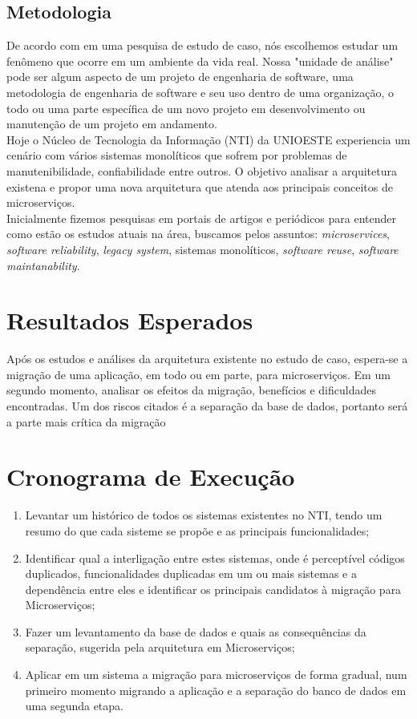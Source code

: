 \documentclass[12pt]{article}
\begin{document}
\subsection{Metodologia}
De acordo com \cite{PERRUNESON2012} em uma pesquisa de estudo de caso, nós escolhemos estudar um fenômeno que ocorre em um ambiente da vida real. Nossa "unidade de análise"\hspace{0.05cm} pode ser algum aspecto de um projeto de engenharia de software, uma metodologia de engenharia de software e seu uso dentro de uma organização, o todo ou uma parte específica de um novo projeto em desenvolvimento ou manutenção de um projeto em andamento.
\\Hoje o Núcleo de Tecnologia da Informação (NTI) da UNIOESTE experiencia um cenário com vários sistemas monolíticos que sofrem por problemas de manutenibilidade, confiabilidade entre outros. O objetivo analisar a arquitetura existena e propor uma nova arquitetura que atenda aos principais conceitos de microserviços.
\\Inicialmente fizemos pesquisas em portais de artigos e periódicos para entender como estão os estudos atuais na área, buscamos pelos assuntos: \textit{microservices}, \textit{software reliability}, \textit{legacy system}, sistemas monolíticos, \textit{software reuse}, \textit{software maintanability}.
 
\section{Resultados Esperados}

Após os estudos e análises da arquitetura existente no estudo de caso, espera-se a migração de uma aplicação, em todo ou em parte, para microserviços. Em um segundo momento, analisar os efeitos da migração, benefícios e dificuldades encontradas. Um dos riscos citados é a separação da base de dados, portanto será a parte mais crítica da migração

\section{Cronograma de Execução}

\begin{enumerate}
	\item Levantar um histórico de todos os sistemas existentes no NTI, tendo um resumo do que cada sisteme se propõe e as principais funcionalidades;
	\item Identificar qual a interligação entre estes sistemas, onde é perceptível códigos duplicados, funcionalidades duplicadas em um ou mais sistemas e a dependência entre eles e identificar os principais candidatos à migração para Microserviços;
	\item Fazer um levantamento da base de dados e quais as consequências da separação, sugerida pela arquitetura em Microserviços;
	\item Aplicar em um sistema a migração para microserviços de forma gradual, num primeiro momento migrando a aplicação e a separação do banco de dados em uma segunda etapa.
	
\end{enumerate}
\end{document}
